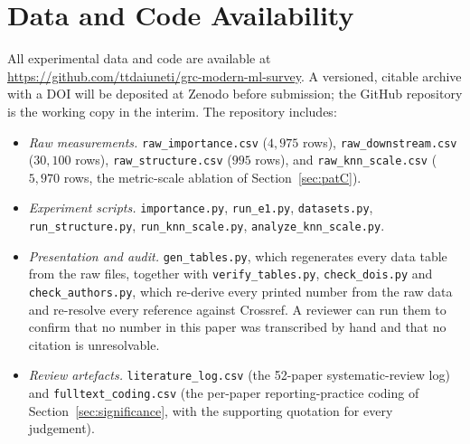 \section*{Data and Code Availability}
All experimental data and code are available at
\url{https://github.com/ttdaiuneti/grc-modern-ml-survey}.  A versioned,
citable archive with a DOI will be deposited at Zenodo before submission;
the GitHub repository is the working copy in the interim.  The repository
includes:
\begin{itemize}[leftmargin=*,itemsep=1pt]
  \item \emph{Raw measurements.}
        \texttt{raw\_importance.csv} ($4{,}975$ rows),
        \texttt{raw\_downstream.csv} ($30{,}100$ rows),
        \texttt{raw\_structure.csv} ($995$ rows), and
        \texttt{raw\_knn\_scale.csv} ($5{,}970$ rows, the metric-scale
        ablation of Section~\ref{sec:patC}).
  \item \emph{Experiment scripts.} \texttt{importance.py},
        \texttt{run\_e1.py}, \texttt{datasets.py}, \texttt{run\_structure.py},
        \texttt{run\_knn\_scale.py}, \texttt{analyze\_knn\_scale.py}.
  \item \emph{Presentation and audit.} \texttt{gen\_tables.py}, which
        regenerates every data table from the raw files, together with
        \texttt{verify\_tables.py}, \texttt{check\_dois.py} and
        \texttt{check\_authors.py}, which re-derive every printed number from
        the raw data and re-resolve every reference against Crossref.  A
        reviewer can run them to confirm that no number in this paper was
        transcribed by hand and that no citation is unresolvable.
  \item \emph{Review artefacts.} \texttt{literature\_log.csv} (the 52-paper
        systematic-review log) and \texttt{fulltext\_coding.csv} (the
        per-paper reporting-practice coding of Section~\ref{sec:significance},
        with the supporting quotation for every judgement).
\end{itemize}
